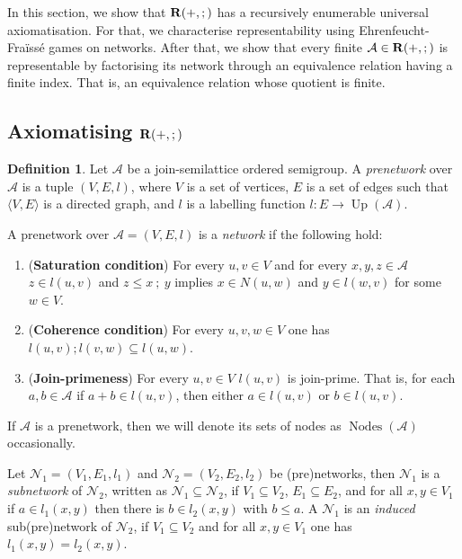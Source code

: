 \documentclass[a4paper]{article}
\theoremstyle{definition}
\newtheorem{definition}{Definition}
\theoremstyle{theorem}
\theoremstyle{proposition}
\theoremstyle{lemma}
\theoremstyle{ex}
\theoremstyle{corollary}
\theoremstyle{claim}
\begin{document}
In this section, we show that ${\bf R}(+, ;)$ has a recursively enumerable universal axiomatisation. For that, we characterise representability using Ehrenfeucht-Fra\"{i}ss\'{e} games on networks. After that, we show that every finite $\mathcal{A} \in {\bf R}(+, ;)$ is representable by factorising its network through an equivalence relation having a finite index. That is, an equivalence relation whose quotient is finite.

\subsection{Axiomatising ${\bf R}(+, ;)$}

\begin{definition} Let $\mathcal{A}$ be a join-semilattice ordered semigroup. A \emph{prenetwork} over $\mathcal{A}$ is a tuple $(V, E, l)$, where $V$ is a set of vertices, $E$ is a set of edges such that $\langle V, E \rangle$ is a directed graph, and $l$ is a labelling function $l : E \to \operatorname{Up}(\mathcal{A})$.

  A prenetwork over $\mathcal{A} = (V, E, l)$ is a \emph{network} if the following hold:
  \begin{enumerate}
    \item ({\bf Saturation condition}) For every $u, v \in V$ and for every $x,y,z \in \mathcal{A}$ $z \in l(u, v)$ and $z \leq x \: ; \: y$ implies $x \in N(u, w)$ and $y \in l(w, v)$ for some $w \in V$.
    \item ({\bf Coherence condition}) For every $u, v, w \in V$ one has $l(u, v) ; l(v, w) \subseteq l(u, w)$.
    \item ({\bf Join-primeness}) For every $u, v \in V$ $l(u,v)$ is join-prime. That is, for each $a, b \in \mathcal{A}$ if $a + b \in l(u,v)$, then either $a \in l(u,v)$ or $b \in l(u,v)$.
  \end{enumerate}
\end{definition}

If $\mathcal{A}$ is a prenetwork, then we will denote its sets of nodes as $\operatorname{Nodes}(\mathcal{A})$ occasionally.

Let $\mathcal{N}_1 = (V_1, E_1, l_1)$ and $\mathcal{N}_2 = (V_2, E_2, l_2)$ be (pre)networks, then $\mathcal{N}_1$ is a \emph{subnetwork} of $\mathcal{N}_2$, written as $\mathcal{N}_1 \subseteq \mathcal{N}_2$,
if $V_1 \subseteq V_2$, $E_1 \subseteq E_2$, and for all $x, y \in V_1$ if $a \in l_1(x, y)$ then there is $b \in l_2(x, y)$ with $b \leq a$. A $\mathcal{N}_1$ is an \emph{induced} sub(pre)network of $\mathcal{N}_2$, if $V_1 \subseteq V_2$ and for all $x, y \in V_1$ one has $l_1(x,y) = l_2(x,y)$.
\end{document}
